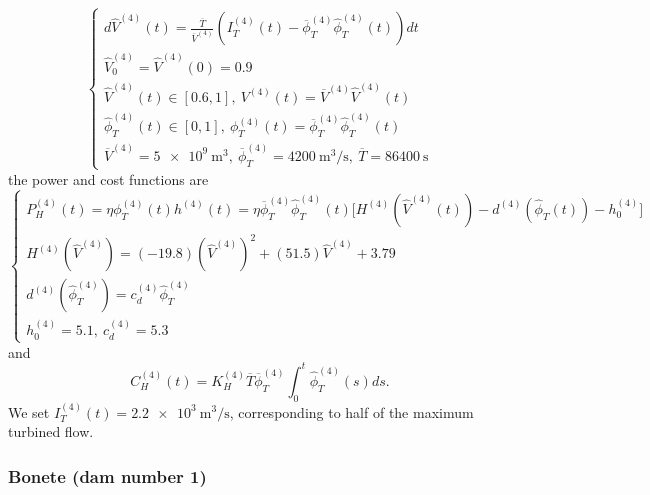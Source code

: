\documentclass[12pt]{article}
\theoremstyle{definition}
\theoremstyle{remark}
\begin{document}
\begin{equation*}
\begin{cases}
d\hat{V}^{(4)}(t)=\frac{\overline{T}}{\overline{V}^{(4)}}(I_T^{(4)}(t)-\overline{\phi}_T^{(4)}\hat{\phi}_T^{(4)}(t))dt\\
\hat{V}_0^{(4)}=\hat{V}^{(4)}(0)=0.9\\
\hat{V}^{(4)}(t)\in[0.6,1],\ V^{(4)}(t)=\overline{V}^{(4)}\hat{V}^{(4)}(t)\\
\hat{\phi}_T^{(4)}(t)\in[0,1],\ \phi_T^{(4)}(t)=\overline{\phi}_T^{(4)}\hat{\phi}_T^{(4)}(t)\\
\overline{V}^{(4)}=\SI{5e9}{\m^3},\ \overline{\phi}_T^{(4)}=\SI{4200}{\m^3/\s},\ \overline{T}=\SI{86400}{\s}
\end{cases}
\end{equation*}
the power and cost functions are
\begin{equation*}
\begin{cases}
P_H^{(4)}(t)=\eta\phi_T^{(4)}(t)h^{(4)}(t)=\eta\overline{\phi}_T^{(4)}\hat{\phi}_T^{(4)}(t)\Big[H^{(4)}(\hat{V}^{(4)}(t))-d^{(4)}(\hat{\phi}_T(t))-h_0^{(4)}\Big]\\
H^{(4)}(\hat{V}^{(4)})=(-19.8)(\hat{V}^{(4)})^2+(51.5)\hat{V}^{(4)}+3.79\\
d^{(4)}(\hat{\phi}_T^{(4)})=c_d^{(4)}\hat{\phi}_T^{(4)}\\
h_0^{(4)}=5.1,\ c_d^{(4)}=5.3
\end{cases}
\end{equation*}
and
\begin{equation*}
C_H^{(4)}(t)=K_H^{(4)}\overline{T}\overline{\phi}_T^{(4)}\int_0^t\hat{\phi}_T^{(4)}(s)ds.
\end{equation*}
We set $I_T^{(4)}(t)=\SI{2.2e3}{\m^3/\s}$, corresponding to half of the maximum turbined flow.

\subsubsection{Bonete (dam number 1)}
\end{document}
